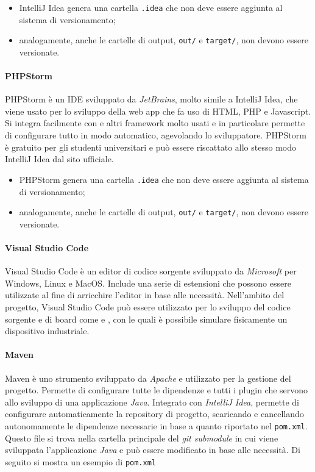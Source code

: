 					\begin{itemize}
						\item IntelliJ Idea genera una cartella \verb!.idea! che non deve essere aggiunta al sistema di versionamento;
						\item analogamente, anche le cartelle di output, \verb!out/! e \verb!target/!, non devono essere versionate.
					\end{itemize}

				\paragraph{PHPStorm}
					PHPStorm è un IDE sviluppato da \textit{JetBrains}, molto simile a IntelliJ Idea, che viene usato per lo sviluppo della web app che fa uso di HTML, PHP e Javascript. Si integra facilmente con  e altri framework molto usati e in particolare permette di configurare tutto in modo automatico, agevolando lo sviluppatore. PHPStorm è gratuito per gli studenti universitari e può essere riscattato allo stesso modo IntelliJ Idea dal sito ufficiale. 

					\begin{itemize}
						\item PHPStorm genera una cartella \verb!.idea! che non deve essere aggiunta al sistema di versionamento;
						\item analogamente, anche le cartelle di output, \verb!out/! e \verb!target/!, non devono essere versionate.
					\end{itemize}

				\paragraph{Visual Studio Code} 
					Visual Studio Code è un editor di codice sorgente sviluppato da \textit{Microsoft} per Windows, Linux e MacOS. Include una serie di estensioni che possono essere utilizzate al fine di arricchire l'editor in base alle necessità. Nell'ambito del progetto, Visual Studio Code può essere utilizzato per lo sviluppo del codice sorgente e di board come  e , con le quali è possibile simulare fisicamente un dispositivo industriale.
				
				\paragraph{Maven}
					Maven è uno strumento sviluppato da \textit{Apache} e utilizzato per la gestione del progetto. Permette di configurare tutte le dipendenze e tutti i plugin che servono allo sviluppo di una applicazione \textit{Java}. Integrato con \textit{IntelliJ Idea}, permette di configurare automaticamente la repository di progetto, scaricando e cancellando autonomamente le dipendenze necessarie in base a quanto riportato nel \verb!pom.xml!. Questo file si trova nella cartella principale del \textit{git submodule} in cui viene sviluppata l'applicazione \textit{Java} e può essere modificato in base alle necessità. Di seguito si mostra un esempio di \verb!pom.xml!


